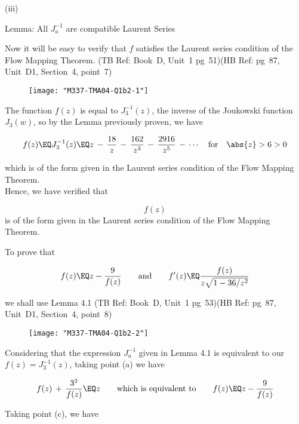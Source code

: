 \documentclass[english,a4paper,11pt]{scrartcl}
\begin{document}
\begin{labeling}{(iii) }
\begin{TextBox} [width=0.98, frame=black!60,  titlebar=cyan!10]{Lemma: \quad All $J_a^{-1}$ are compatible Laurent Series}
\begin{small}
\end{small}
\end{TextBox}

Now it will be easy to verify that $f$ satisfies the Laurent series condition of the Flow Mapping Theorem. (TB Ref: Book~D, Unit~1 pg~51)(HB Ref: pg~87, Unit~D1, Section~4, point~7)\\

\bigskip
\begin{figure}[H]
	\centering
	\texttt{[image: "M337-TMA04-Q1b2-1"]}
\end{figure}


The function $f(z)$ is equal to $J_3^{-1}(z)$, the inverse of the Joukowski function $J_3(w)$, so by the Lemma previously proven, we have

\[ f(z) \EQ J_3^{-1}(z) \EQ   z \,-\, \frac{18}{z} \,-\, \frac{162}{z^3} \,-\,  \frac{2916}{z^5}  \,-\, \cdots \quad \text{for} \quad \abs{z} > 6 > 0 \]

which is of the form given in the Laurent series condition of the Flow Mapping Theorem. \\

\bigskip
Hence, we have verified that \\

\bigskip
\begin{Answer}
\[ f(z) \]
is of the form given in the Laurent series condition of the Flow Mapping Theorem.
\end{Answer}

\newpage
  \item [(iii)]  To prove that 
  
\[ f(z)  \EQ z - \frac{9}{f(z)} \qquad \text{and} \qquad 
   f'(z) \EQ \frac{f(z)}{z \sqrt{1 - 36/z^2}} \]

we shall use Lemma 4.1 (TB Ref: Book~D, Unit~1 pg~53)(HB Ref: pg~87, Unit~D1, Section~4, point~8) \\

\bigskip
\begin{figure}[H]
	\centering
	\texttt{[image: "M337-TMA04-Q1b2-2"]}
\end{figure}
 
Considering that the expression $J_a^{-1}$ given in Lemma 4.1 is equivalent to our $f(z) = J_3^{-1}(z)$, taking point (a) we have

\[ f(z) \,+\, \frac{3^2}{f(z)} \EQ z \qquad \text{which is equivalent to} \qquad f(z)  \EQ z - \frac{9}{f(z)} \]

\bigskip
Taking point (c), we have


\end{labeling}
\end{document}

